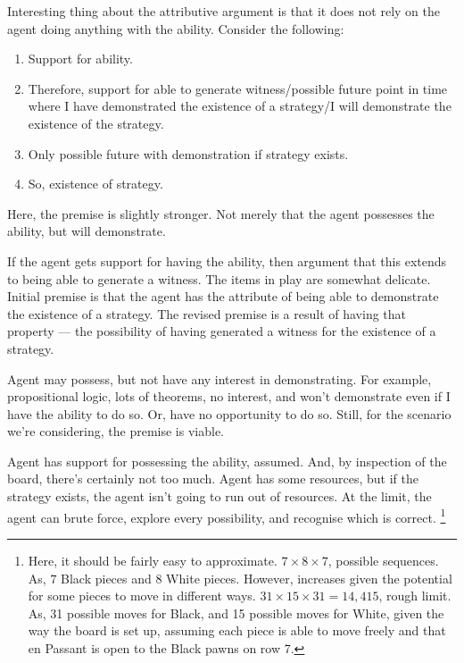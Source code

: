 \documentclass[10pt]{article}
\begin{document}
\begin{note}
  Interesting thing about the attributive argument is that it does not rely on the agent doing anything with the ability.
  Consider the following:

  \begin{enumerate}
  \item Support for ability.
  \item Therefore, support for able to generate witness/possible future point in time where I have demonstrated the existence of a strategy/I will demonstrate the existence of the strategy.
  \item Only possible future with demonstration if strategy exists.
  \item So, existence of strategy.
  \end{enumerate}

  Here, the premise is slightly stronger.
  Not merely that the agent possesses the ability, but will demonstrate.

   If the agent gets support for having the ability, then argument that this extends to being able to generate a witness.
  The items in play are somewhat delicate.
  Initial premise is that the agent has the attribute of being able to demonstrate the existence of a strategy.
  The revised premise is a result of having that property --- the possibility of having generated a witness for the existence of a strategy.

  Agent may possess, but not have any interest in demonstrating.
  For example, propositional logic, lots of theorems, no interest, and won't demonstrate even if I have the ability to do so.
  Or, have no opportunity to do so.
  Still, for the scenario we're considering, the premise is viable.

  Agent has support for possessing the ability, assumed.
  And, by inspection of the board, there's certainly not too much.
  Agent has some resources, but if the strategy exists, the agent isn't going to run out of resources.
  At the limit, the agent can brute force, explore every possibility, and recognise which is correct.\nolinebreak
  \footnote{
    \color{red}
    Here, it should be fairly easy to approximate.
    \(7 \times 8 \times 7\), possible sequences.
    As, \(7\) Black pieces and \(8\) White pieces.
    However, increases given the potential for some pieces to move in different ways.
    \(31 \times 15 \times 31 = 14,415\), rough limit.
    As, 31 possible moves for Black, and 15 possible moves for White, given the way the board is set up, assuming each piece is able to move freely and that en Passant is open to the Black pawns on row 7.

}
\end{note}
\end{document}
